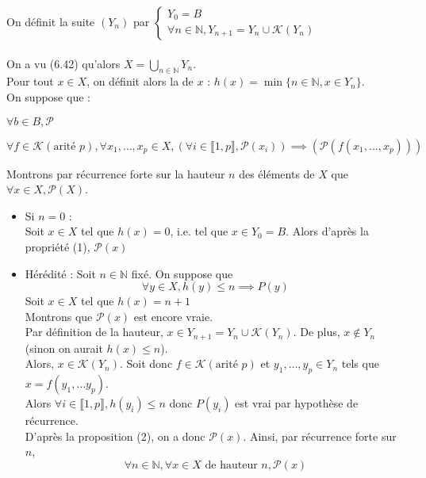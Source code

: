 \begin{demonstration}
    On définit la suite $(Y_n)$ par $\begin{cases}
        Y_0 =  B \\
        \forall n \in \mathbb{N}, Y_{n+1} = Y_n \cup \mathcal{K}(Y_n)
    \end{cases}$ \\ \\
    On a vu (6.42) qu'alors $X = \bigcup_{n \in \mathbb{N}}Y_n$. \\ Pour tout $x \in X$, on définit alors la  de $x$ : $h(x) = \min \{n \in \mathbb{N}, x \in Y_n\}$. \\
    On suppose que : \begin{enumeratebf}
        \item $\forall b \in B, \mathcal{P}$
        \item $\forall f \in \mathcal{K} (\text{arité }p), \forall x_1,\ldots, x_p \in X, (\forall i \in \llbracket 1,p \rrbracket, \mathcal{P}(x_i)) \implies (\mathcal{P}(f(x_1,\ldots,x_p)))$
    \end{enumeratebf}
    Montrons par récurrence forte sur la hauteur $n$ des éléments de $X$ que $\forall x \in X, \mathcal{P}(X)$.
    \begin{itemize}
        \item Si $n = 0$ : \\Soit $x \in X$ tel que $h(x) = 0$, i.e. tel que $x \in Y_0 = B$. Alors d'après la propriété (1), $\mathcal{P}(x)$
        \item Hérédité : Soit $n \in \mathbb{N}$ fixé. On suppose que $$\forall y \in X, h(y) \leq n \implies P(y)$$ Soit $x \in X$ tel que $h(x) = n+1$ \\ Montrons que $\mathcal{P}(x)$ est encore vraie.\\Par définition de la hauteur, $x \in Y_{n+1} = Y_{n} \cup \mathcal{K}(Y_n)$. De plus, $x \notin Y_n$ (sinon on aurait $h(x) \leq n$).\\Alors, $x \in \mathcal{K}(Y_n)$. Soit donc $f \in \mathcal{K} (\text{arité }p)$ et $y_1, \ldots, y_p \in Y_n$ tels que $x = f(y_1,\ldots y_p)$.\\ Alors $\forall i \in \llbracket 1,p \rrbracket, h(y_i) \leq n$ donc $P(y_i)$ est vrai par hypothèse de récurrence.\\D'après la proposition (2), on a donc $\mathcal{P}(x)$. Ainsi, par récurrence forte sur $n$, $$\forall n \in \mathbb{N}, \forall x \in X \text{ de hauteur } n, \mathcal{P}(x)$$
    \end{itemize}
\end{demonstration}

